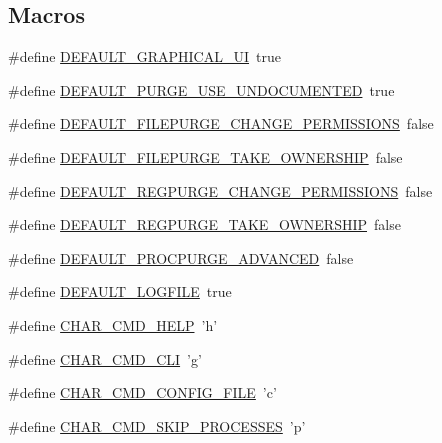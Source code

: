 \subsection*{Macros}
\begin{DoxyCompactItemize}
\item 
\#define \hyperlink{_configuration_8h_aec3fd4383432d7b9010a0c2fc356cba7}{D\-E\-F\-A\-U\-L\-T\-\_\-\-G\-R\-A\-P\-H\-I\-C\-A\-L\-\_\-\-U\-I}~true
\item 
\#define \hyperlink{_configuration_8h_a91794511cfd885599fe552eeb78c2e98}{D\-E\-F\-A\-U\-L\-T\-\_\-\-P\-U\-R\-G\-E\-\_\-\-U\-S\-E\-\_\-\-U\-N\-D\-O\-C\-U\-M\-E\-N\-T\-E\-D}~true
\item 
\#define \hyperlink{_configuration_8h_a4122d5f7777bb8da80d8d8e7bebde257}{D\-E\-F\-A\-U\-L\-T\-\_\-\-F\-I\-L\-E\-P\-U\-R\-G\-E\-\_\-\-C\-H\-A\-N\-G\-E\-\_\-\-P\-E\-R\-M\-I\-S\-S\-I\-O\-N\-S}~false
\item 
\#define \hyperlink{_configuration_8h_ab22eac373b8d19b283a5c5242d078142}{D\-E\-F\-A\-U\-L\-T\-\_\-\-F\-I\-L\-E\-P\-U\-R\-G\-E\-\_\-\-T\-A\-K\-E\-\_\-\-O\-W\-N\-E\-R\-S\-H\-I\-P}~false
\item 
\#define \hyperlink{_configuration_8h_a984c45d9995767dc935c08b43e19ab3c}{D\-E\-F\-A\-U\-L\-T\-\_\-\-R\-E\-G\-P\-U\-R\-G\-E\-\_\-\-C\-H\-A\-N\-G\-E\-\_\-\-P\-E\-R\-M\-I\-S\-S\-I\-O\-N\-S}~false
\item 
\#define \hyperlink{_configuration_8h_a0af70e855b4cf41b15d7f5c57e9bc38f}{D\-E\-F\-A\-U\-L\-T\-\_\-\-R\-E\-G\-P\-U\-R\-G\-E\-\_\-\-T\-A\-K\-E\-\_\-\-O\-W\-N\-E\-R\-S\-H\-I\-P}~false
\item 
\#define \hyperlink{_configuration_8h_ad93d93d1904def3de9244aa36e25d038}{D\-E\-F\-A\-U\-L\-T\-\_\-\-P\-R\-O\-C\-P\-U\-R\-G\-E\-\_\-\-A\-D\-V\-A\-N\-C\-E\-D}~false
\item 
\#define \hyperlink{_configuration_8h_a4d68235dfa433dea9c42f14784f80f6a}{D\-E\-F\-A\-U\-L\-T\-\_\-\-L\-O\-G\-F\-I\-L\-E}~true
\item 
\#define \hyperlink{_configuration_8h_a75971c1090578b7d2475b912551d6839}{C\-H\-A\-R\-\_\-\-C\-M\-D\-\_\-\-H\-E\-L\-P}~'h'
\item 
\#define \hyperlink{_configuration_8h_a420a71a4de8846f375fb10f17fc33059}{C\-H\-A\-R\-\_\-\-C\-M\-D\-\_\-\-C\-L\-I}~'g'
\item 
\#define \hyperlink{_configuration_8h_a870d7fda819f9e1545c65887c221f9e8}{C\-H\-A\-R\-\_\-\-C\-M\-D\-\_\-\-C\-O\-N\-F\-I\-G\-\_\-\-F\-I\-L\-E}~'c'
\item 
\#define \hyperlink{_configuration_8h_a3af2b716f43db237ddb6d840092d1f1d}{C\-H\-A\-R\-\_\-\-C\-M\-D\-\_\-\-S\-K\-I\-P\-\_\-\-P\-R\-O\-C\-E\-S\-S\-E\-S}~'p'

\end{DoxyCompactItemize}

